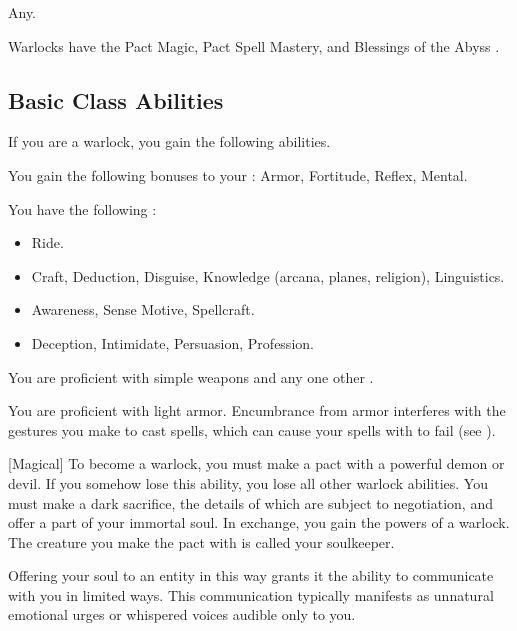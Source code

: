      Any.

     Warlocks have the Pact Magic, Pact Spell Mastery, and Blessings of the Abyss .

    \subsection{Basic Class Abilities}
        If you are a warlock, you gain the following abilities.

        You gain the following bonuses to your :  Armor,  Fortitude,  Reflex,  Mental.

        You have the following :
        \begin{itemize}
            \item {} Ride.
            \item {} Craft, Deduction, Disguise, Knowledge (arcana, planes, religion), Linguistics.
            \item {} Awareness, Sense Motive, Spellcraft.
            \item {} Deception, Intimidate, Persuasion, Profession.
        \end{itemize}

        You are proficient with simple weapons and any one other .

        You are proficient with light armor.
        Encumbrance from armor interferes with the gestures you make to cast spells, which can cause your spells with  to fail (see ).

        [Magical]
        To become a warlock, you must make a pact with a powerful demon or devil.
        If you somehow lose this ability, you lose all other warlock abilities.
        You must make a dark sacrifice, the details of which are subject to negotiation, and offer a part of your immortal soul.
        In exchange, you gain the powers of a warlock.
        The creature you make the pact with is called your soulkeeper.

        Offering your soul to an entity in this way grants it the ability to communicate with you in limited ways.
        This communication typically manifests as unnatural emotional urges or whispered voices audible only to you.

